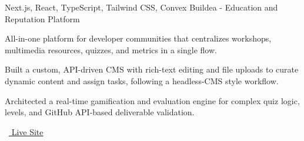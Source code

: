 \begin{cventries}
  \vspace{6mm}
  \cventry
    {Next.js, React, TypeScript, Tailwind CSS, Convex} %
    {Buildea - Education and Reputation Platform} %
    {} %
    {} %
    {
      \begin{cvitems} %
        \item {All-in-one platform for developer communities that centralizes workshops, multimedia resources, quizzes, and metrics in a single flow.}
        \item {Built a custom, API-driven CMS with rich-text editing and file uploads to curate dynamic content and assign tasks, following a headless-CMS style workflow.}
        \item {Architected a real-time gamification and evaluation engine for complex quiz logic, levels, and GitHub API-based deliverable validation.}
        \item {\faLink\ \href{https://app.buildea.dev/}{ Live Site}}
      \end{cvitems}
    }

\end{cventries}
